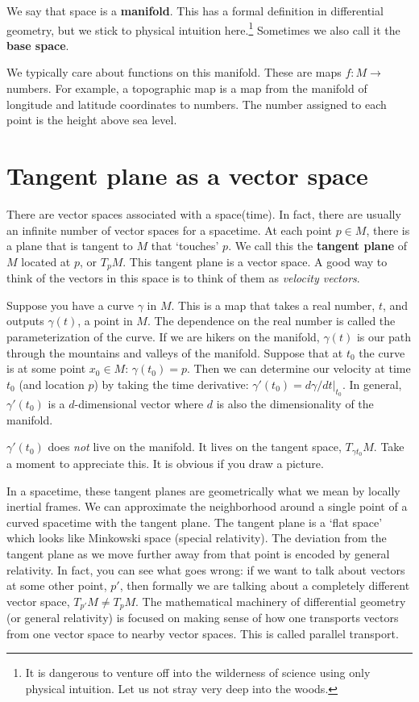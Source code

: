 \documentclass[
  11pt,
	colorful,
	raggedright,
]{tufte-style-thesis-flip}
\begin{document}
We say that space is a \textbf{manifold}. This has a formal definition in differential geometry, but we stick to physical intuition here.\footnote{It is dangerous to venture off into the wilderness of science using only physical intuition. Let us not stray very deep into the woods.} Sometimes we also call it the \textbf{base space}.

We typically care about functions on this manifold. These are maps $f: M\to$ numbers. For example, a topographic map is a map from the manifold of longitude and latitude coordinates to numbers. The number assigned to each point is the height above sea level. 

\section{Tangent plane as a vector space}

There are vector spaces associated with a space(time). In fact, there are usually an infinite number of vector spaces for a spacetime. At each point $p\in M$, there is a plane that is tangent to $M$ that `touches' $p$. We call this the \textbf{tangent plane} of $M$ located at $p$, or $T_pM$. This tangent plane is a vector space. A good way to think of the vectors in this space is to think of them as \emph{velocity vectors}.

Suppose you have a curve $\gamma$ in $M$. This is a map that takes a real number, $t$, and outputs $\gamma(t)$, a point in $M$. The dependence on the real number is called the parameterization of the curve. If we are hikers on the manifold, $\gamma(t)$ is our path through the mountains and valleys of the manifold. Suppose that at $t_0$ the curve is at some point $x_0\in M$: $\gamma(t_0) = p$. Then we can determine our velocity at time $t_0$ (and location $p$) by taking the time derivative: $\gamma'(t_0) = \left.d\gamma/dt\right|_{t_0}$. In general, $\gamma'(t_0)$ is a $d$-dimensional vector where $d$ is also the dimensionality of the manifold. 

$\gamma'(t_0)$ does \emph{not} live on the manifold. It lives on the tangent space, $T_{\gamma{t_0}}M$. Take a moment to appreciate this. It is obvious if you draw a picture.

In a spacetime, these tangent planes are geometrically what we mean by locally inertial frames. We can approximate the neighborhood around a single point of a curved spacetime with the tangent plane. The tangent plane is a `flat space' which looks like Minkowski space (special relativity). The deviation from the tangent plane as we move further away from that point is encoded by general relativity. In fact, you can see what goes wrong: if we want to talk about vectors at some other point, $p'$, then formally we are talking about a completely different vector space, $T_{p'}M \neq T_pM$. The mathematical machinery of differential geometry (or general relativity) is focused on making sense of how one transports vectors from one vector space to nearby vector spaces. This is called parallel transport.
\end{document}
